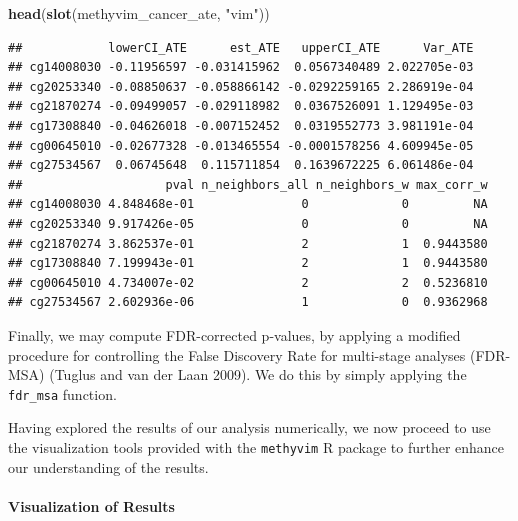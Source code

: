 \documentclass[9pt,a4paper,]{extarticle}
\newenvironment{Shaded}{\begin{snugshade}}{\end{snugshade}}
\newcommand{\KeywordTok}[1]{\textcolor[rgb]{0.13,0.29,0.53}{\textbf{#1}}}
\newcommand{\DataTypeTok}[1]{\textcolor[rgb]{0.13,0.29,0.53}{#1}}
\newcommand{\StringTok}[1]{\textcolor[rgb]{0.31,0.60,0.02}{#1}}
\newcommand{\OperatorTok}[1]{\textcolor[rgb]{0.81,0.36,0.00}{\textbf{#1}}}
\newcommand{\NormalTok}[1]{#1}
\theoremstyle{definition}
\theoremstyle{definition}
\theoremstyle{definition}
\theoremstyle{remark}
\begin{document}
\begin{Shaded}
\begin{Highlighting}[]
\KeywordTok{head}\NormalTok{(}\KeywordTok{slot}\NormalTok{(methyvim_cancer_ate, }\StringTok{"vim"}\NormalTok{))}
\end{Highlighting}
\end{Shaded}

\begin{verbatim}
##            lowerCI_ATE      est_ATE   upperCI_ATE      Var_ATE
## cg14008030 -0.11956597 -0.031415962  0.0567340489 2.022705e-03
## cg20253340 -0.08850637 -0.058866142 -0.0292259165 2.286919e-04
## cg21870274 -0.09499057 -0.029118982  0.0367526091 1.129495e-03
## cg17308840 -0.04626018 -0.007152452  0.0319552773 3.981191e-04
## cg00645010 -0.02677328 -0.013465554 -0.0001578256 4.609945e-05
## cg27534567  0.06745648  0.115711854  0.1639672225 6.061486e-04
##                    pval n_neighbors_all n_neighbors_w max_corr_w
## cg14008030 4.848468e-01               0             0         NA
## cg20253340 9.917426e-05               0             0         NA
## cg21870274 3.862537e-01               2             1  0.9443580
## cg17308840 7.199943e-01               2             1  0.9443580
## cg00645010 4.734007e-02               2             2  0.5236810
## cg27534567 2.602936e-06               1             0  0.9362968
\end{verbatim}

Finally, we may compute FDR-corrected p-values, by applying a modified
procedure for controlling the False Discovery Rate for multi-stage
analyses (FDR-MSA) (Tuglus and van der Laan 2009). We do this by simply
applying the \texttt{fdr\_msa} function.

\begin{Shaded}
\end{Shaded}

Having explored the results of our analysis numerically, we now proceed
to use the visualization tools provided with the \texttt{methyvim} R
package to further enhance our understanding of the results.

\paragraph{Visualization of Results}\label{visualization-of-results}
\end{document}
